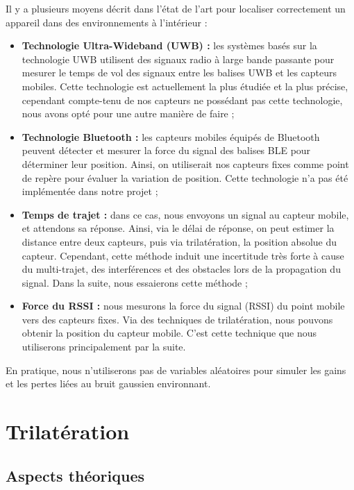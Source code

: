 \documentclass[french, a4paper, 12pt, parskip]{scrartcl}
\begin{document}
Il y a plusieurs moyens décrit dans l'état de l'art pour localiser correctement
un appareil dans des environnements à l'intérieur \cite{UWB, RSSI} :
\begin{itemize}
\item
  \textbf{Technologie Ultra-Wideband (UWB) :} les systèmes basés sur la
    technologie UWB utilisent des signaux radio à large bande passante pour
    mesurer le temps de vol des signaux entre les balises UWB et les capteurs
    mobiles. Cette technologie est actuellement la plus étudiée et la plus
    précise, cependant compte-tenu de nos capteurs ne possédant pas cette
    technologie, nous avons opté pour une autre manière de faire ;
\item
  \textbf{Technologie Bluetooth :} les capteurs mobiles équipés de Bluetooth
    peuvent détecter et mesurer la force du signal des balises BLE pour
    déterminer leur position. Ainsi, on utiliserait nos capteurs fixes comme
    point de repère pour évaluer la variation de position. Cette technologie
    n'a pas été implémentée dans notre projet ;
\item
  \textbf{Temps de trajet :} dans ce cas, nous envoyons un signal au capteur
    mobile, et attendons sa réponse. Ainsi, via le délai de réponse, on peut
    estimer la distance entre deux capteurs, puis via trilatération, la
    position absolue du capteur. Cependant, cette méthode induit une
    incertitude très forte à cause du multi-trajet, des interférences et des
    obstacles lors de la propagation du signal. Dans la suite, nous essaierons
    cette méthode ;
\item
  \textbf{Force du RSSI :} nous mesurons la force du signal (RSSI) du point
    mobile vers des capteurs fixes. Via des techniques de trilatération, nous
    pouvons obtenir la position du capteur mobile. C'est cette technique que
    nous utiliserons principalement par la suite.
\end{itemize}

En pratique, nous n'utiliserons pas de variables aléatoires pour simuler les
gains et les pertes liées au bruit gaussien environnant.

\section{Trilatération}

\subsection{Aspects théoriques}
\end{document}
